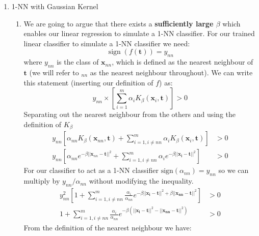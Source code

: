 \documentclass{article}
\begin{document}
\begin{enumerate}
\begin{enumerate}
    \end{enumerate}
    \item 1-NN with Gaussian Kernel
    \begin{enumerate}[label=\roman*.]
        \item We are going to argue that there exists a \textbf{sufficiently large $\beta$} which enables our linear regression to simulate a 1-NN classifier. For our trained linear classifier to simulate a 1-NN classifier we need:
        \begin{equation*}
            \operatorname{sign}(f(\mathbf{t})) = y_{nn}
        \end{equation*}
        where $y_{nn}$ is the class of $\mathbf{x}_{nn}$, which is defined as the nearest neighbour of $\mathbf{t}$ (we will refer to $_{nn}$ as the nearest neighbour throughout). We can write this statement (inserting our definition of $f$) as:
        \begin{equation*}
            y_{nn}\times\left[\sum\limits_{i=1}^m\alpha_{i}K_{\beta}(\mathbf{x}_i, \mathbf{t})\right] > 0
        \end{equation*}
        Separating out the nearest neighbour from the others and using the definition of $K_{\beta}$
        \begin{align*}
            y_{nn}\left[\alpha_{nn}K_{\beta}(\mathbf{x}_{nn}, \mathbf{t}) + \sum\limits_{i=1, i\ne nn}^m\alpha_{i}K_{\beta}(\mathbf{x}_i, \mathbf{t})\right] &> 0 \\
            y_{nn}\left[\alpha_{nn}e^{-\beta||\mathbf{x}_{nn} - \mathbf{t}||^2} + \sum\limits_{i=1, i\ne nn}^m\alpha_{i}e^{-\beta||\mathbf{x_{i}} - \mathbf{t}||^2}\right] &> 0
        \end{align*}
        For our classifier to act as a 1-NN classifier $\text{sign}(\alpha_{nn}) = y_{nn}$ so we can multiply by $y_{nn}/\alpha_{nn}$ without modifying the inequality.
        \begin{align*}
            y_{nn}^2\left[1 + \sum\limits_{i=1, i\ne nn}^m\frac{\alpha_{i}}{\alpha_{nn}}e^{-\beta||\mathbf{x_{i}} - \mathbf{t}||^2 + \beta||\mathbf{x_{nn}} - \mathbf{t}||^2}\right] &> 0 \\
            1 + \sum\limits_{i=1, i\ne nn}^m\frac{\alpha_{i}}{\alpha_{nn}}e^{-\beta(||\mathbf{x_{i}} - \mathbf{t}||^2 - ||\mathbf{x_{nn}} - \mathbf{t}||^2)} &> 0
        \end{align*}
        From the definition of the nearest neighbour we have:
        \begin{align*}

\end{align*}
\end{enumerate}
\end{enumerate}
\end{document}
